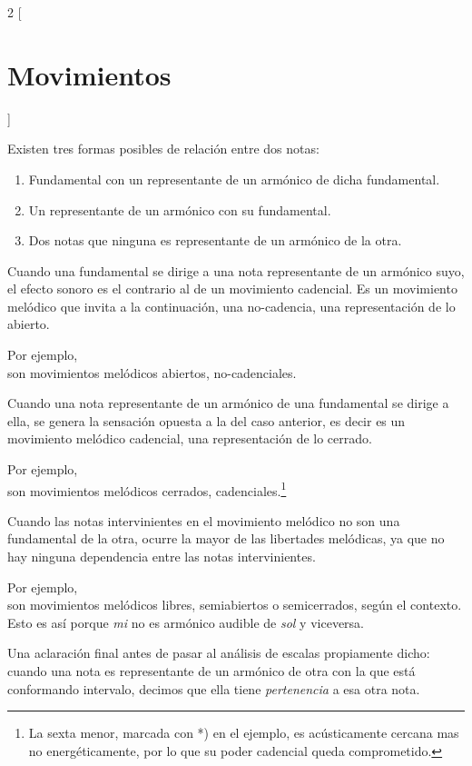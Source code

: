 \documentclass[a4paper,11pt]{article}
\begin{document}
\begin{multicols}{2}
[\section{Movimientos}\label{sec:movimientos}]

  Existen tres formas posibles de relación entre dos notas:
  \begin{enumerate}
    \item Fundamental con un representante de un armónico de dicha fundamental.
    \item Un representante de un armónico con su fundamental.
    \item Dos notas que ninguna es representante de un armónico de la otra.
  \end{enumerate}

  Cuando una fundamental se dirige a una nota representante de un armónico suyo, el efecto sonoro es el contrario al de un movimiento cadencial. Es un movimiento melódico que invita a la continuación, una no-cadencia, una representación de lo abierto.

  Por ejemplo, \\   son movimientos melódicos abiertos, no-cadenciales.

  Cuando una nota representante de un armónico de una fundamental se dirige a ella, se genera la sensación opuesta a la del caso anterior, es decir es un movimiento melódico cadencial, una representación de lo cerrado.

  Por ejemplo, \\  son movimientos melódicos cerrados, cadenciales.\footnote{La sexta menor, marcada con *) en el ejemplo, es acústicamente cercana mas no energéticamente, por lo que su poder cadencial queda comprometido.}

  Cuando las notas intervinientes en el movimiento melódico no son una fundamental de la otra, ocurre la mayor de las libertades melódicas, ya que no hay ninguna dependencia entre las notas intervinientes.

  Por ejemplo, \\   son movimientos melódicos libres, semiabiertos o semicerrados, según el contexto. Esto es así porque \emph{mi} no es armónico audible de \emph{sol} y viceversa.

  Una aclaración final antes de pasar al análisis de escalas propiamente dicho: cuando una nota es representante de un armónico de otra con la que está conformando intervalo, decimos que ella tiene \emph{pertenencia} a esa otra nota.
\end{multicols}
\end{document}
